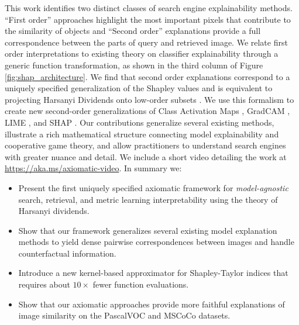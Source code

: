 \documentclass{article} %
\begin{document}
 This work identifies two distinct classes of search engine explainability methods. ``First order'' approaches highlight the most important pixels that contribute to the similarity of objects and ``Second order'' explanations provide a full correspondence between the parts of query and retrieved image. We relate first order interpretations to existing theory on classifier explainability through a generic function transformation, as shown in the third column of Figure \ref{fig:shap_architecture}. We find that second order explanations correspond to a uniquely specified generalization of the Shapley values \citep{sundararajan2020shapley} and is equivalent to projecting Harsanyi Dividends onto low-order subsets \citep{harsanyi1963simplified}. We use this formalism to create new second-order generalizations of Class Activation Maps \citep{zhou2015cnnlocalization}, GradCAM \citep{gradcam}, LIME \citep{lime}, and SHAP \citep{shap}. Our contributions generalize several existing methods, illustrate a rich mathematical structure connecting model explainability and cooperative game theory, and allow practitioners to understand search engines with greater nuance and detail.  We include a short video detailing the work at {\color{blue}\url{https://aka.ms/axiomatic-video}}.
 In summary we:
  \vspace{-.07in}
\begin{itemize}
    \itemsep-0em 
    \item Present the first uniquely specified axiomatic framework for \textit{model-agnostic} search, retrieval, and metric learning interpretability using the theory of Harsanyi dividends.
    \item Show that our framework generalizes several existing model explanation methods \citep{zhou2015cnnlocalization,gradcam,vedml,lime} to yield dense pairwise correspondences between images and handle counterfactual information.
    \item Introduce a new kernel-based approximator for Shapley-Taylor indices that requires about $10\times$ fewer function evaluations.
    \item Show that our axiomatic approaches provide more faithful explanations of image similarity on the PascalVOC and MSCoCo datasets.
\end{itemize}
\end{document}
